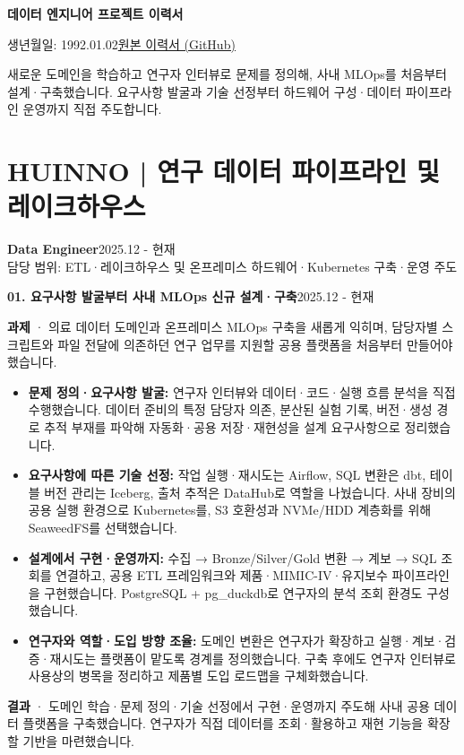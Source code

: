\documentclass[a4paper,11pt]{article}
\newcommand{\role}[3]{\textbf{#1}\hfill{\small #2}\\{\small\color{muted}#3}\par}
\newcommand{\project}[2]{\vspace{5pt}\textbf{\color{accent}#1}\hfill{\small\color{muted}#2}\par}
\newcommand{\birthdate}{1992.01.02}
\begin{document}
{\fontsize{25}{31}\selectfont\bfseries\color{accent}데이터 엔지니어 프로젝트 이력서}\par
{\small 생년월일: \birthdate\hfill\href{https://github.com/msk-psp/resume/blob/master/resume_korean.pdf}{\color{accent}\underline{원본 이력서 (GitHub)}}}\par
새로운 도메인을 학습하고 연구자 인터뷰로 문제를 정의해, 사내 MLOps를 처음부터 설계·구축했습니다. 요구사항 발굴과 기술 선정부터 하드웨어 구성·데이터 파이프라인 운영까지 직접 주도합니다.

\section{HUINNO | 연구 데이터 파이프라인 및 레이크하우스}
\role{Data Engineer}{2025.12 - 현재}{담당 범위: ETL·레이크하우스 및 온프레미스 하드웨어·Kubernetes 구축·운영 주도}

\project{01. 요구사항 발굴부터 사내 MLOps 신규 설계·구축}{2025.12 - 현재}
\textbf{과제} · 의료 데이터 도메인과 온프레미스 MLOps 구축을 새롭게 익히며, 담당자별 스크립트와 파일 전달에 의존하던 연구 업무를 지원할 공용 플랫폼을 처음부터 만들어야 했습니다.
\begin{itemize}
\item \textbf{문제 정의·요구사항 발굴:} 연구자 인터뷰와 데이터·코드·실행 흐름 분석을 직접 수행했습니다. 데이터 준비의 특정 담당자 의존, 분산된 실험 기록, 버전·생성 경로 추적 부재를 파악해 자동화·공용 저장·재현성을 설계 요구사항으로 정리했습니다.
\item \textbf{요구사항에 따른 기술 선정:} 작업 실행·재시도는 Airflow, SQL 변환은 dbt, 테이블 버전 관리는 Iceberg, 출처 추적은 DataHub로 역할을 나눴습니다. 사내 장비의 공용 실행 환경으로 Kubernetes를, S3 호환성과 NVMe/HDD 계층화를 위해 SeaweedFS를 선택했습니다.
\item \textbf{설계에서 구현·운영까지:} 수집 → Bronze/Silver/Gold 변환 → 계보 → SQL 조회를 연결하고, 공용 ETL 프레임워크와 제품·MIMIC-IV·유지보수 파이프라인을 구현했습니다. PostgreSQL + pg\_duckdb로 연구자의 분석 조회 환경도 구성했습니다.
\item \textbf{연구자와 역할·도입 방향 조율:} 도메인 변환은 연구자가 확장하고 실행·계보·검증·재시도는 플랫폼이 맡도록 경계를 정의했습니다. 구축 후에도 연구자 인터뷰로 사용상의 병목을 정리하고 제품별 도입 로드맵을 구체화했습니다.
\end{itemize}
\textbf{결과} · 도메인 학습·문제 정의·기술 선정에서 구현·운영까지 주도해 사내 공용 데이터 플랫폼을 구축했습니다. 연구자가 직접 데이터를 조회·활용하고 재현 기능을 확장할 기반을 마련했습니다.
\end{document}
